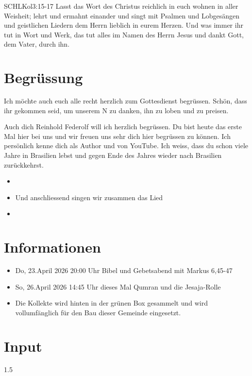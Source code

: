 \documentclass[fontsize=14pt]{mybib}
\newcommand{\Name}{Reinhold Federolf}
\begin{document}
\begin{bibelbox}{SCHL}{Kol}{3:15-17}
    Lasst das Wort des Christus reichlich in euch wohnen in aller Weisheit; lehrt und ermahnt einander und singt mit Psalmen und Lobgesängen und geistlichen Liedern dem Herrn lieblich in eurem Herzen. Und was immer ihr tut in Wort und Werk, das tut alles im Namen des Herrn Jesus und dankt Gott, dem Vater, durch ihn.
\end{bibelbox}
\section{Begrüssung}
Ich möchte auch euch alle recht herzlich zum Gottesdienst begrüssen. Schön, dass ihr gekommen seid, um unserem \herr N zu danken, ihn zu loben und zu preisen.

Auch dich \Name{} will ich herzlich begrüssen. Du bist heute das erste Mal hier bei uns und wir freuen uns sehr dich hier begrüssen zu können. Ich persönlich kenne dich als Author und von YouTube. Ich weiss, dass du schon viele Jahre in Brasilien lebst und gegen Ende des Jahres wieder nach Brasilien zurückkehrst.
\begin{itemize}
    \item[] 
    \item[] Und anschliessend singen wir zusammen das Lied
    \item[] 
\end{itemize}

\section{Informationen}
\begin{itemize}
    \item {} Do, 23.April 2026 20:00 Uhr Bibel und Gebetsabend mit Markus 6,45-47
    \item {} So, 26.April 2026 14:45 Uhr dieses Mal Qumran und die Jesaja-Rolle

    \item {} Die Kollekte wird hinten in der grünen Box gesammelt und wird vollumfänglich für den Bau dieser Gemeinde eingesetzt.
\end{itemize}

\section{ Input }
\begin{spacing}{1.5}
    
\end{spacing}
\end{document}
